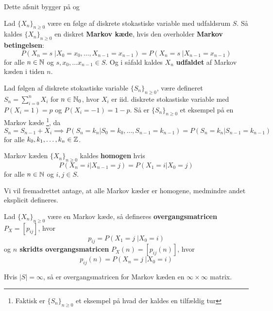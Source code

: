 Dette afsnit bygger på \cite{sandsynlighedsBog} og \cite{grimsandsynlighedsBog}
\begin{defn}
Lad $\{X_n\}_{n  \geq 0}$ være en følge af diskrete stokastiske variable med udfaldsrum $S$. Så kaldes $\{X_n\}_{n \geq 0}$ en diskret \textbf{Markov kæde}, hvis den overholder \textbf{Markov betingelsen}:
\begin{equation*}
    P(X_n = s \;| X_0 = x_0, \ldots, X_{n - 1} = x_{n - 1}) = P(X_n = s \;| X_{n - 1} = x_{n - 1})
\end{equation*}
for alle $n \in \mathbb{N}$ og $s, x_0, \ldots x_{n - 1} \in S$. Og i såfald kaldes $X_n$ \textbf{udfaldet} af Markov kæden i tiden $n$.
\end{defn}
\begin{exmp} Lad følgen af diskrete stokastiske variable $\{S_{n}\}_{n \geq 0}$, være defineret $S_{n} = \sum_{i=0}^n X_{i}$ for $n \in \mathbb{N}_{0}$, hvor $X_{i}$ er iid. diskrete stokastiske variable med $P(X_{i} = 1) = p$ og $P(X_{i} = -1) = 1 - p$. Så er $\{S_{n}\}_{n \geq 0}$ et eksempel på en Markov kæde \footnote{Faktisk er $\{S_{n}\}_{n \geq 0}$ et eksempel på hvad der kaldes en tilfældig tur}, da
  \begin{equation*}
    S_{n} = S_{n - 1} + X_{i} \implies P(S_{n} = k_{n} | S_{0} = k_{0}, \ldots, S_{n - 1} = k_{n - 1}) = P(S_{n} = k_{n} | S_{n - 1} = k_{n - 1})
  \end{equation*}
  for alle $k_{0}, k_{1}, \ldots, k_{n} \in \mathbb{Z}$.
\end{exmp}
\begin{defn}
Markov kæden $\{X_n\}_{n \geq 0}$ kaldes \textbf{homogen} hvis
\begin{equation*}
    P(X_n = i | X_{n - 1} = j) = P(X_1 = i | X_0 = j)
\end{equation*}
for alle $n \in \mathbb{N}$ og $i, j \in S$.
\end{defn}
Vi vil fremadrettet antage, at alle Markov kæder er homogene, medmindre andet eksplicit defineres.
\begin{defn}
Lad $\{X_n\}_{n \geq 0}$ være en Markov kæde, så defineres \textbf{overgangsmatricen} $P_X = [p_{ij}]$, hvor 
\begin{equation*}
    p_{ij} = P(X_1 = j \;| X_0 = i)
\end{equation*}
og \textbf{$n$ skridts overgangsmatricen} $P_X(n) = [p_{ij}(n)]$, hvor
\begin{equation*}
    p_{ij}(n) = P(X_n = j \;| X_0 = i)
\end{equation*}
\end{defn}
\begin{remark}
  Hvis $|S| = \infty$, så er overgangsmatricen for Markov kæden en $\infty \times \infty$ matrix.
\end{remark}

